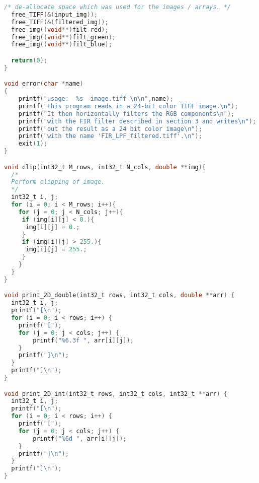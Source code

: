 \documentclass{article}
\begin{document}
\begin{lstlisting}[language=C, caption=filter\_image\_section5.c, label={lst:sec5}]
  /* de-allocate space which was used for the images / arrays. */
  free_TIFF(&(input_img));
  free_TIFF(&(filtered_img));
  free_img((void**)filt_red);
  free_img((void**)filt_green);
  free_img((void**)filt_blue);

  return(0);
}

void error(char *name)
{
    printf("usage:  %s  image.tiff \n\n",name);
    printf("this program reads in a 24-bit color TIFF image.\n");
    printf("It then horizontally filters the RGB components\n");
    printf("with the FIR filter described in section 3 and writes\n");
    printf("out the result as a 24 bit color image\n");
    printf("with the name 'FIR_LPF_filtered.tiff'.\n");
    exit(1);
}

void clip(int32_t M_rows, int32_t N_cols, double **img){
  /*
  Perform clipping of image.
  */
  int32_t i, j;
  for (i = 0; i < M_rows; i++){
    for (j = 0; j < N_cols; j++){
     if (img[i][j] < 0.){
      img[i][j] = 0.;
     }
     if (img[i][j] > 255.){
      img[i][j] = 255.;
     }
    } 
  }
}

void print_2D_double(int32_t rows, int32_t cols, double **arr) {
  int32_t i, j;
  printf("[\n");
  for (i = 0; i < rows; i++) {
    printf("[");
    for (j = 0; j < cols; j++) {
        printf("%6.3f ", arr[i][j]);
    }
    printf("]\n");
  }
  printf("]\n");
}

void print_2D_int(int32_t rows, int32_t cols, int32_t **arr) {
  int32_t i, j;
  printf("[\n");
  for (i = 0; i < rows; i++) {
    printf("[");
    for (j = 0; j < cols; j++) {
        printf("%6d ", arr[i][j]);
    }
    printf("]\n");
  }
  printf("]\n");
}
\end{lstlisting}
\end{document}
